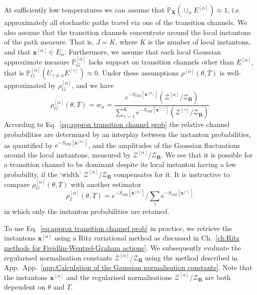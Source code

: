 At sufficiently low temperatures we can assume that $\mathbb{P}_\mathbf{X}(\cup_{\alpha} E^{[\alpha]})\approx 1$, i.e. approximately all stochastic paths travel via one of the
transition channels. We also assume that the transition channels concentrate around the local instantons of the path measure. That is, $J = K$, where $K$ is the number of local instantons, and that $\mathbf{x}^{[\alpha]}\in E_{\alpha}$. Furthermore, we assume that each local Gaussian approximate measure $\mathbb{P}_G^{[\alpha]}$ lacks support on transition channels other than $E^{[\alpha]}$, that is $\mathbb{P}_G^{[\alpha]}(U_{\gamma \neq \alpha} E^{[\gamma]}) \approx 0$. Under these assumptions $\rho^{[\alpha]}(\theta,T)$ is well-approximated by $\rho_G^{[\alpha]}$, and we have
\begin{equation} \label{eq:approx transition channel prob}
\rho_G^{[\alpha]}(\theta,T) = w_{\alpha} = \frac{e^{-S_{\text{OM}}[\mathbf{x}^{[\alpha]}]} (\mathcal{Z}^{[\alpha]} / \mathcal{Z}_\mathbf{B}) }{ \sum_{\gamma=1}^{K}e^{-S_{\text{OM}}[\mathbf{x}^{[\gamma]}]}(\mathcal{Z}^{[\gamma]} / \mathcal{Z}_\mathbf{B}) }
\end{equation}
According to Eq.~\ref{eq:approx transition channel prob} the relative channel probabilities are determined by an interplay between the instanton probabilities, as quantified by $e^{-S_{\text{OM}}[\mathbf{x}^{[\alpha]}]}$, and the amplitudes of the Gaussian fluctuations around the local instantons, measured by $\mathcal{Z}^{[\alpha]}/ \mathcal{Z}_\mathbf{B}$. We see that it is possible for a transition channel to be dominant despite its local instanton having a low probability, if the `width' $\mathcal{Z}^{[\alpha]}/ \mathcal{Z}_\mathbf{B}$ compensates for it. It is instructive to compare $\rho_G^{[\alpha]}(\theta,T)$  with another estimator
\begin{equation}
	\rho_{I}^{[\alpha]}(\theta,T)=e^{-S_{\text{OM}}[\mathbf{x}^{[\alpha]}]}/\sum_{\gamma}e^{-S_{\text{OM}}[\mathbf{x}^{[\gamma]}]}
\end{equation}
in which only the instanton probabilities are retained.

To use Eq.~\ref{eq:approx transition channel prob} in practice, we retrieve the instantons
$\mathbf{x}^{[\alpha]}$ using a Ritz variational method as discussed in Ch.~\ref{ch:Ritz methods for Freidlin-Wentzel-Graham actions}. We subsequently evaluate the regularised normalisation constants $\mathcal{Z}^{[\alpha]} / \mathcal{Z}_\mathbf{B}$ using the method described in App.~App.~\ref{app:Calculation of the Gaussian normalisation constants}. Note that the instantons $\mathbf{x}^{[\alpha]}$ and the regularised normalisations $\mathcal{Z}^{[\alpha]} / \mathcal{Z}_\mathbf{B}$ are both dependent on $\theta$ and $T$.

